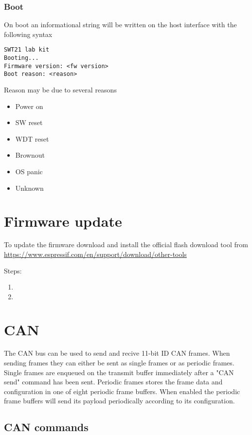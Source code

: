 \documentclass{article}[a4paper]
\begin{document}
\subsubsection{Boot}
On boot an informational string will be written on the host interface with
the following syntax

\begin{verbatim}
SWT21 lab kit
Booting...
Firmware version: <fw version>
Boot reason: <reason>
\end{verbatim}

Reason may be due to several reasons
\begin{itemize}
\item Power on
\item SW reset
\item WDT reset
\item Brownout
\item OS panic
\item Unknown
\end{itemize}

\section{Firmware update}
To update the firmware download and install the official flash download tool from
\url{https://www.espressif.com/en/support/download/other-tools}

Steps:
\begin{enumerate}
\item
\item
\end{enumerate}

\section{CAN}
The CAN bus can be used to send and recive 11-bit ID CAN frames.
When sending frames they can either be sent as single frames or as periodic
frames. Single frames are enqueued on the transmit buffer immediately after a
"CAN send" command has been sent. Periodic frames stores the frame data and
configuration in one
of eight periodic frame buffers. When enabled the periodic frame buffers will
send its payload periodically according to its configuration.


\subsection{CAN commands}
\end{document}
